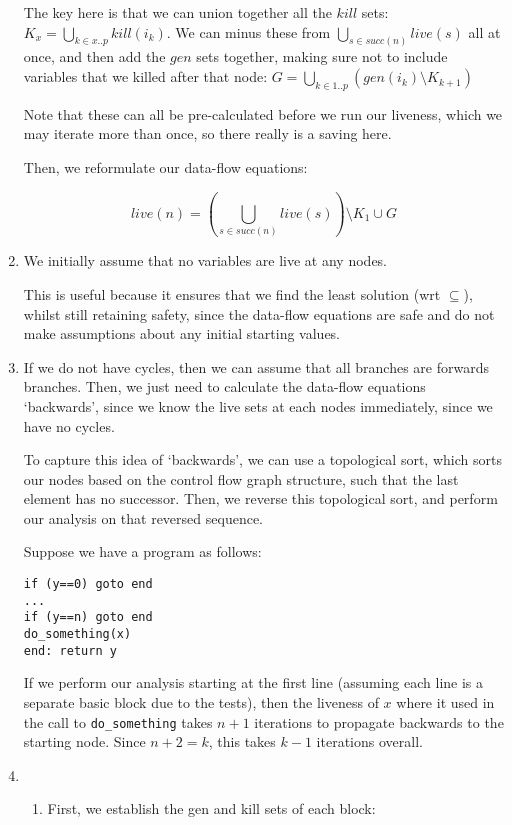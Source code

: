 \begin{enumerate}[label=(\alph*)]
  The key here is that we can union together all the $kill$ sets: $K_x = \bigcup_{k \in x..p} kill(i_k)$. We can minus these from $\bigcup_{s \in succ(n)} live(s)$ all at once, and then add the $gen$ sets together, making sure not to include variables that we killed after that node: $G = \bigcup_{k \in 1..p} (gen(i_k) \setminus K_{k+1})$

  Note that these can all be pre-calculated before we run our liveness, which we may iterate more than once, so there really is a saving here.

  Then, we reformulate our data-flow equations:

  \[
    live(n) = \left(\bigcup_{s \in succ(n)} live(s)\right) \setminus K_1 \cup G
  \] 

\item
  We initially assume that no variables are live at any nodes.
  
  This is useful because it ensures that we find the least solution (wrt $\subseteq$), whilst still retaining safety, since the data-flow equations are safe and do not make assumptions about any initial starting values.

\item
  If we do not have cycles, then we can assume that all branches are forwards branches. Then, we just need to calculate the data-flow equations `backwards', since we know the live sets at each nodes immediately, since we have no cycles.

To capture this idea of `backwards', we can use a topological sort, which sorts our nodes based on the control flow graph structure, such that the last element has no successor. Then, we reverse this topological sort, and perform our analysis on that reversed sequence.

Suppose we have a program as follows:

\begin{verbatim}
if (y==0) goto end
...
if (y==n) goto end
do_something(x)
end: return y
\end{verbatim}

If we perform our analysis starting at the first line (assuming each line is a separate basic block due to the tests), then the liveness of $x$ where it used in the call to \texttt{do\_something} takes $n+1$ iterations to propagate backwards to the starting node. Since $n+2= k$, this takes $k-1$ iterations overall.

\item
  \begin{enumerate}[label=(\roman*)]
    \item
      First, we establish the gen and kill sets of each block:


\end{enumerate}
\end{enumerate}

